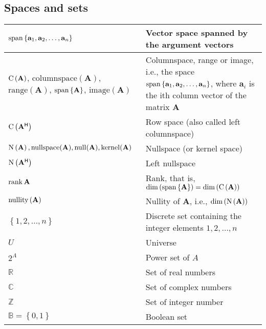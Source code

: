 \documentclass{article}
\begin{document}
\subsection{Spaces and sets}
\begin{xltabular}{\textwidth}{XX}
    \(\operatorname{span}\left\{\mathbf{a}_1, \mathbf{a}_2, \dots, \mathbf{a}_n\right\}\) & Vector space spanned by the argument vectors \cite{golubMatrixComputations2013}\\ \hline
    \(\operatorname{C}\left(\mathbf{A}\right)\), \(\mathrm{columnspace}(\mathbf{A})\), \(\mathrm{range}(\mathbf{A})\), \(\operatorname{span}\left\{\mathbf{A}\right\}\), \(\mathrm{image}(\mathbf{A})\)    & Columnspace, range or image, i.e., the space \(\operatorname{span}\left\{\mathbf{a}_1,\mathbf{a}_2, \dots, \mathbf{a}_n\right\}\), where \(\mathbf{a}_i\) is the ith column vector of the matrix \(\mathbf{A}\) \cite{strangIntroductionLinearAlgebra1993, nossekAdaptiveArraySignal2015}\\ \hline
    \(\operatorname{C}\left(\mathbf{A}^\mathsf{H}\right)\) & Row space (also called left columnspace) \cite{strangIntroductionLinearAlgebra1993, nossekAdaptiveArraySignal2015}\\ \hline
    \(\operatorname{N}\left(\mathbf{A}\right), \mathrm{nullspace}(\mathbf{A}), \mathrm{null}(\mathbf{A}), \mathrm{kernel}(\mathbf{A})\) & Nullspace (or kernel space) \cite{strangIntroductionLinearAlgebra1993, nossekAdaptiveArraySignal2015,theodoridisMachineLearningBayesian2020}\\ \hline
    \(\operatorname{N}\left(\mathbf{A^\mathsf{H}}\right)\)          & Left nullspace\\ \hline
    \(\rank{\mathbf{A}}\)  & Rank, that is, \(\operatorname{dim}\left(\operatorname{span}\left\{\mathbf{A}\right\}\right) = \operatorname{dim}\left(\operatorname{C}\left(\mathbf{A}\right)\right)\) \cite{nossekAdaptiveArraySignal2015} \\ \hline
    \(\operatorname{nullity}\left(\mathbf{A}\right)\)          & Nullity of \(\mathbf{A}\), i.e., \(\operatorname{dim}\left(\operatorname{N}\left(\mathbf{A}\right)\right)\)\\ \hline
    \(\left\{ 1,2, \dots, n \right\}\) & Discrete set containing the integer elements \(1,2, \dots, n\)\\ \hline
    \(U\) & Universe\\ \hline
    \(2^A\) & Power set of \(A\)\\ \hline
    \(\mathbb{R}\) & Set of real numbers\\ \hline
    \(\mathbb{C}\)& Set of complex numbers\\ \hline
    \(\mathbb{Z}\) & Set of integer number\\ \hline
    \(\mathbb{B} = \left\{ 0, 1 \right\}\) & Boolean set\\ \hline %

\end{xltabular}
\end{document}
